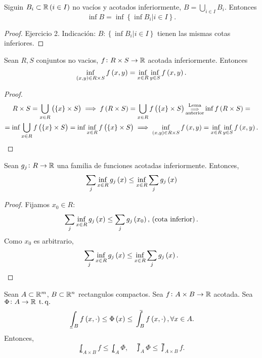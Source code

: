 \begin{lema}
    Siguin $B_i \subset \mathbb{R} \left( i\in I\right)$ no vacíos y acotados inferiormente, $B = \bigcup\limits_{i\in I} B_i$. Entonces
    \[ \inf B = \inf\left\{\inf B_i | i\in I\right\}.\]
\end{lema}
\begin{proof}
    Ejercicio 2. Indicación: $B \colon \left\{ \inf B_i | i\in I\right\}$ tienen las mismas cotas inferiores.
\end{proof}
\begin{lema}\label{lema:2_6_1}
    Sean $R, S$ conjuntos no vacios, $f \colon R\times S \to \mathbb{R}$ acotada inferiormente. Entonces
    \[ \inf_{\left( x,y\right)\in R\times S} f\left( x,y\right) = \inf_{x\in R}\inf_{y\in S} f\left( x,y\right). \]
\end{lema}
\begin{proof}
    \begin{gather*}
        R\times S = \bigcup_{x\in R} \left( \left\{x\right\}\times S\right) \implies f\left( R\times S\right) = \bigcup_{x\in R} f\left(\left\{ x\right\} \times S\right) \substack{\text{Lema}\\ \implies\\ \text{anterior}} \inf f\left( R\times S \right) = \\ = \inf \bigcup_{x\in R} f\left( \left\{x\right\} \times S\right) = \inf \inf_{x\in R} f\left( \left\{x\right\} \times S\right) \implies \inf_{\left( x,y\right) \in R\times S} f\left( x,y\right) = \inf_{x\in R} \inf_{y\in S} f\left( x,y\right).
    \end{gather*}
\end{proof}
\begin{lema}\label{lema:2_6_2}
    Sean $g_j \colon R \to \mathbb{R}$ una familia de funciones acotadas inferiormente. Entonces,
    \[ \sum_j \inf_{x\in R} g_j\left( x\right) \leq \inf_{x\in R} \sum_j g_j\left( x\right) \]
\end{lema}
\begin{proof}
    Fijamos $x_0 \in R:$
    \[ \sum_j \inf_{x\in R} g_j\left( x\right) \leq \sum_j g_j \left( x_0\right), \,\left(\text{cota inferior}\right). \]
    Como $x_0$ es arbitrario,
    \[ \sum_j \inf_{x\in R} g_j\left( x\right) \leq \inf_{x\in R} \sum_j g_j\left( x\right). \]
\end{proof}
\begin{lema}\label{lema:fubin_exp}
    Sean $A \subset \mathbb{R}^m$, $B \subset \mathbb{R}^n$ rectangulos compactos. Sea $f \colon A\times B\to\mathbb{R}$ acotada. Sea $\Phi \colon A\to\mathbb{R} \operatorname{\;t.q.\;}$
    \[ \lowint_B f\lp x,\cdot\rp\leq\Phi\lp x\rp\leq\upint_B f\lp x,\cdot\rp, \forall x\in A. \]
    Entonces,
    \[
        \lowint_{A\times B} f \leq \lowint_A \Phi, \quad
        \upint_A \Phi \leq \upint_{A\times B} f.
    \]
\end{lema}
